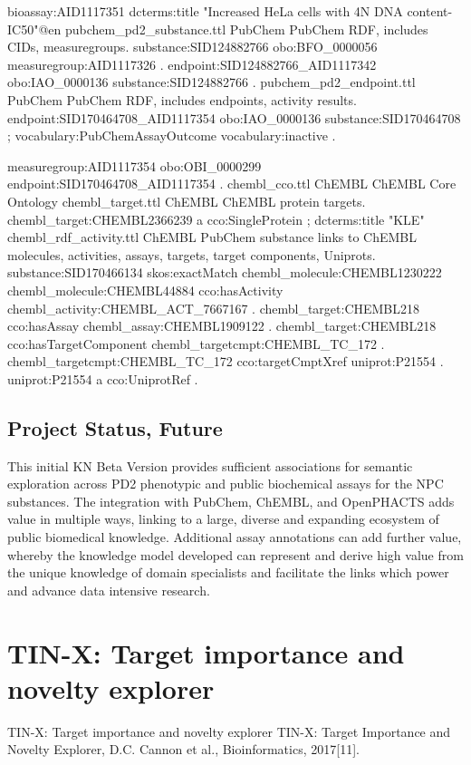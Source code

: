 bioassay:AID1117351 dcterms:title "Increased HeLa cells with 4N DNA content-IC50"@en 
pubchem\_pd2\_substance.ttl
PubChem
PubChem RDF, includes CIDs, measuregroups.
substance:SID124882766 obo:BFO\_0000056 measuregroup:AID1117326 .
endpoint:SID124882766\_AID1117342 obo:IAO\_0000136 substance:SID124882766 .
pubchem\_pd2\_endpoint.ttl
PubChem
PubChem RDF, includes endpoints, activity results.
endpoint:SID170464708\_AID1117354
    obo:IAO\_0000136 substance:SID170464708 ;
    vocabulary:PubChemAssayOutcome vocabulary:inactive .

measuregroup:AID1117354 obo:OBI\_0000299 endpoint:SID170464708\_AID1117354 .
chembl\_cco.ttl
ChEMBL
ChEMBL Core Ontology
chembl\_target.ttl
ChEMBL
ChEMBL protein targets.
chembl\_target:CHEMBL2366239 a cco:SingleProtein ;
        dcterms:title "KLE"
chembl\_rdf\_activity.ttl
ChEMBL
PubChem substance links to ChEMBL molecules, activities, assays, targets, target components, Uniprots.
substance:SID170466134 skos:exactMatch chembl\_molecule:CHEMBL1230222
chembl\_molecule:CHEMBL44884 cco:hasActivity chembl\_activity:CHEMBL\_ACT\_7667167 .
chembl\_target:CHEMBL218 cco:hasAssay chembl\_assay:CHEMBL1909122 .
chembl\_target:CHEMBL218 cco:hasTargetComponent chembl\_targetcmpt:CHEMBL\_TC\_172 .
chembl\_targetcmpt:CHEMBL\_TC\_172 cco:targetCmptXref uniprot:P21554 .
uniprot:P21554 a cco:UniprotRef .


\subsection{Project Status, Future}

This initial KN Beta Version provides sufficient associations for semantic exploration across PD2 phenotypic and public biochemical assays for the NPC substances.  The integration with PubChem, ChEMBL, and OpenPHACTS adds value in multiple ways, linking to a large, diverse and expanding ecosystem of public biomedical knowledge.  Additional assay annotations can add further value, whereby the knowledge model developed can represent and derive high value from the unique knowledge of domain specialists and facilitate the links which power and advance data intensive research.



\section{TIN-X: Target importance and novelty explorer}

TIN-X: Target importance and novelty explorer
TIN-X: Target Importance and Novelty Explorer, D.C. Cannon et al., Bioinformatics, 2017[11].

